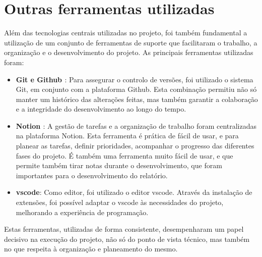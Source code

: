 \section{Outras ferramentas utilizadas}
\label{sec:tools}

Além das tecnologias centrais utilizadas no projeto, foi também fundamental a utilização de um conjunto de ferramentas de suporte que facilitaram o trabalho, a organização e o desenvolvimento do projeto. As principais ferramentas utilizadas foram:

\begin{itemize}
    \item \textbf{Git \cite{git} e Github \cite{github}}: Para assegurar o controlo de versões, foi utilizado o sistema Git, em conjunto com a plataforma Github. Esta combinação permitiu não só manter um histórico  das alterações feitas, mas também garantir a colaboração e a integridade do desenvolvimento ao longo do tempo.

    \item \textbf{Notion \cite{notion}}: A gestão de tarefas e a organização de trabalho foram centralizadas na plataforma Notion. Esta ferramenta é prática de fácil de usar, e para planear as tarefas, definir prioridades, acompanhar o progresso das diferentes fases do projeto. É também uma ferramenta muito fácil de usar, e que permite também tirar notas durante o desenvolvimento, que foram importantes para o desenvolvimento do relatório.

    \item \textbf{\gls{vscode}\cite{vscode}}: Como editor, foi utilizado o editor \gls{vscode}. Através da instalação de extensões, foi possível adaptar o \gls{vscode} às necessidades do projeto, melhorando a experiência de programação.
\end{itemize}

Estas ferramentas, utilizadas de forma consistente, desempenharam um papel decisivo na execução do projeto, não só do ponto de vista técnico, mas também no que respeita à organização e planeamento do mesmo.
